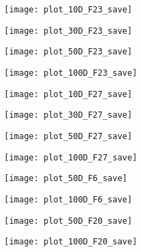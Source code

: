 \begin{figure*}[h!]
    \begin{subfigure}[b]{0.24\textwidth}
        \texttt{[image: plot\_10D\_F23\_save]}
        \caption{}
    \end{subfigure}
    \begin{subfigure}[b]{0.24\textwidth}
        \texttt{[image: plot\_30D\_F23\_save]}
        \caption{}
    \end{subfigure}    
    \begin{subfigure}[b]{0.24\textwidth}
        \texttt{[image: plot\_50D\_F23\_save]}
        \caption{}
    \end{subfigure}
    \begin{subfigure}[b]{0.24\textwidth}
        \texttt{[image: plot\_100D\_F23\_save]}
        \caption{}
    \end{subfigure}

    \begin{subfigure}[b]{0.24\textwidth}
        \texttt{[image: plot\_10D\_F27\_save]}
        \caption{}
    \end{subfigure}
    \begin{subfigure}[b]{0.24\textwidth}
        \texttt{[image: plot\_30D\_F27\_save]}
        \caption{}
    \end{subfigure}    
    \begin{subfigure}[b]{0.24\textwidth}
        \texttt{[image: plot\_50D\_F27\_save]}
        \caption{}
    \end{subfigure}
    \begin{subfigure}[b]{0.24\textwidth}
        \texttt{[image: plot\_100D\_F27\_save]}
        \caption{}
    \end{subfigure}

    \begin{subfigure}[b]{0.24\textwidth}
        \texttt{[image: plot\_50D\_F6\_save]}
        \caption{}
    \end{subfigure}
    \begin{subfigure}[b]{0.24\textwidth}
        \texttt{[image: plot\_100D\_F6\_save]}
        \caption{}
    \end{subfigure}
    \begin{subfigure}[b]{0.24\textwidth}
        \texttt{[image: plot\_50D\_F20\_save]}
        \caption{}
    \end{subfigure}
    \begin{subfigure}[b]{0.24\textwidth}
        \texttt{[image: plot\_100D\_F20\_save]}
        \caption{}
    \end{subfigure}


\end{figure*}
